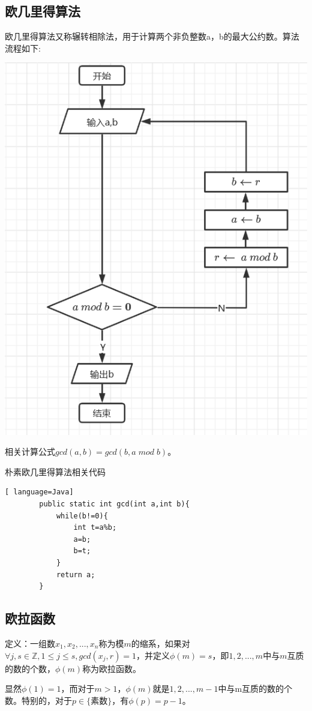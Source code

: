 \documentclass[UTF8,a4paper,11pt]{ctexart}
\begin{document}
\subsection{欧几里得算法}
	\par 欧几里得算法又称辗转相除法，用于计算两个非负整数a，b的最大公约数。算法流程如下:\\
	\centerline{\includegraphics[scale=0.6]{一般欧几里得算法.png}} 
	\par 相关计算公式$gcd(a,b) = gcd(b,a\; mod\; b)$。
	\par 朴素欧几里得算法相关代码
	\begin{lstlisting}[ language=Java]
		public static int gcd(int a,int b){
		    while(b!=0){
		        int t=a%b;
		        a=b;
		        b=t;
		    }
		    return a;
		}
	\end{lstlisting}



\subsection{欧拉函数}
	\par 定义：一组数$x_1,x_2,...,x_n$称为模$m$的缩系，如果对$\forall j,s\in \mathbb{Z}, 1\leqslant j\leqslant s ,gcd(x_j,r)=1$，并定义$\phi(m)=s$，即${1,2,...,m}$中与$m$互质的数的个数，$\phi(m)$称为欧拉函数。
	\par 显然$\phi(1)=1$，而对于$m>1$，$\phi(m)$就是$1,2,...,m-1$中与m互质的数的个数。特别的，对于$p\in \{$素数$\}$，有$\phi(p)=p-1$。
\end{document}
